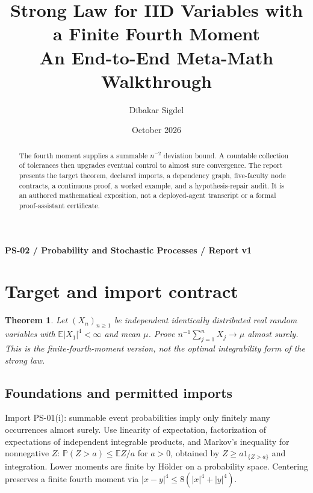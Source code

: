 \documentclass[preprint,12pt,aps,pra,showkeys,amsmath,amssymb,superscriptaddress,floatfix]{revtex4-2}
\newtheorem{theorem}{Theorem}[section]
\theoremstyle{definition}
\theoremstyle{remark}
\begin{document}
\title{Strong Law for IID Variables with a Finite Fourth Moment\\[4pt]\large An End-to-End Meta-Math Walkthrough}

\author{Dibakar Sigdel}


\date{October 2026}

\begin{abstract}

The fourth moment supplies a summable \(n^{-2}\) deviation bound. A
countable collection of tolerances then upgrades eventual control to
almost sure convergence. The report presents the target theorem,
declared imports, a dependency graph, five-faculty node contracts, a
continuous proof, a worked example, and a hypothesis-repair audit. It is
an authored mathematical exposition, not a deployed-agent transcript or
a formal proof-assistant certificate.

\end{abstract}\maketitle\linespread{1.12}\selectfont

\noindent\textbf{PS-02 / Probability and Stochastic Processes / Report v1}

\section{Target and import contract}

\begin{theorem}

Let \((X_n)_{n\ge1}\) be independent identically distributed real random
variables with \(\mathbb E|X_1|^4<\infty\) and mean \(\mu\). Prove
\(n^{-1}\sum_{j=1}^n X_j\to\mu\) almost surely. This is the
finite-fourth-moment version, not the optimal integrability form of the
strong law.

\end{theorem}

\subsection{Foundations and permitted imports}

Import PS-01(i): summable event probabilities imply only finitely many
occurrences almost surely. Use linearity of expectation, factorization
of expectations of independent integrable products, and Markov's
inequality for nonnegative \(Z\): \(\mathbb P(Z>a)\le\mathbb EZ/a\) for
\(a>0\), obtained by \(Z\ge a1_{\{Z>a\}}\) and integration. Lower
moments are finite by Hölder on a probability space. Centering preserves
a finite fourth moment via \(|x-y|^4\le8(|x|^4+|y|^4)\).
\end{document}
